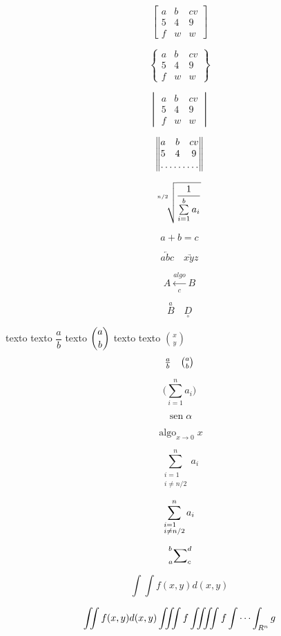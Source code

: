 \documentclass{report}
\numberwithin{equation}{section}
\DeclareMathOperator{\sen}{sen}
\DeclareMathOperator*{\algo}{algo}
\theoremstyle{definition}
\theoremstyle{remark}
\begin{document}
$$
\begin{bmatrix}
a & b & cv \\
5 & 4 & 9 \\
f & w & w
\end{bmatrix}
$$

$$
\begin{Bmatrix}
a & b & cv \\
5 & 4 & 9 \\
f & w & w
\end{Bmatrix}
$$

$$
\begin{vmatrix}
a & b & cv \\
5 & 4 & 9 \\
f & w & w
\end{vmatrix}
$$

$$
\begin{Vmatrix}
a & b & cv \\
5 & 4 & 9 \\
\hdotsfor{3}
\end{Vmatrix}
$$

$$
\sqrt[\uproot{10}\leftroot{7}n/2]{\frac{1}{\sum\limits_{i=1}^b a_i}}
$$

$$
\boxed{a+b=c}
$$

$$
\overleftarrow{abc}\quad \underrightarrow{xyz}
$$

$$
A\xleftarrow[c]{algo}B
$$

$$
\overset{a}{B}\quad \underset{\circ}{D}
$$	


texto texto $\dfrac{a}{b}$ texto $\dbinom{a}{b}$ texto texto $\binom{x}{y}$
$$
\tfrac{a}{b}\quad \tbinom{a}{b}
$$

$$
\biggl(\sum_{i=1}^n a_i \biggr)
$$

$$
\sen \alpha
$$

$$
\algo_{x\to 0} x
$$

$$
\sum_{\substack{i=1\\i\neq n/2}}^n a_i
$$

$$
\sum_{\begin{subarray}{l}i=1\\i\neq n/2\end{subarray}}^n a_i
$$

$$
\sideset{_a^b}{_c^d}\sum
$$

$$
\int\!\!\int f(x,y)d(x,y)
$$

$$
\iint f(x,y)d(x,y)\iiint f\iiiint f\idotsint_{R^n} g
$$


	
	
\end{document}
